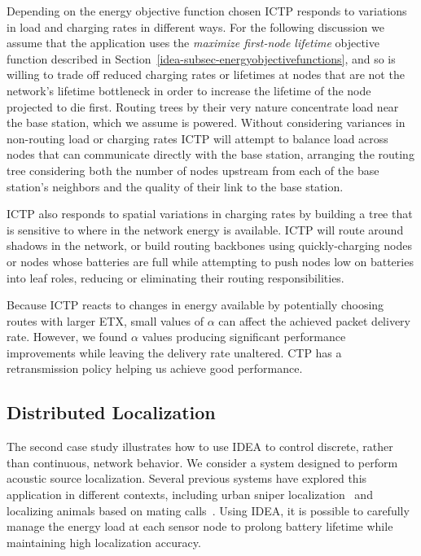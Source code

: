 Depending on the energy objective function chosen ICTP responds to variations
in load and charging rates in different ways. For the following discussion we
assume that the application uses the \textit{maximize first-node lifetime}
objective function described in
Section~\ref{idea-subsec-energyobjectivefunctions}, and so is willing to
trade off reduced charging rates or lifetimes at nodes that are not the
network's lifetime bottleneck in order to increase the lifetime of the node
projected to die first. Routing trees by their very nature concentrate load
near the base station, which we assume is powered. Without considering
variances in non-routing load or charging rates ICTP will attempt to balance
load across nodes that can communicate directly with the base station,
arranging the routing tree considering both the number of nodes upstream from
each of the base station's neighbors and the quality of their link to the
base station.

ICTP also responds to spatial variations in charging rates by building a tree
that is sensitive to where in the network energy is available. ICTP will
route around shadows in the network, or build routing backbones using
quickly-charging nodes or nodes whose batteries are full while attempting to
push nodes low on batteries into leaf roles, reducing or eliminating their
routing responsibilities.

Because ICTP reacts to changes in energy available by potentially choosing
routes with larger ETX, small values of $\alpha$ can affect the achieved
packet delivery rate. However, we found $\alpha$ values producing significant
performance improvements while leaving the delivery rate unaltered. CTP has a
retransmission policy helping us achieve good performance.

\subsection{Distributed Localization}

The second case study illustrates how to use IDEA to control discrete, rather
than continuous, network behavior. We consider a system designed to perform
acoustic source localization. Several previous systems have explored this
application in different contexts, including urban sniper
localization~\cite{shooter-localization} and localizing animals based on
mating calls~\cite{girod-marmots}. Using IDEA, it is possible to carefully
manage the energy load at each sensor node to prolong battery lifetime while
maintaining high localization accuracy.

